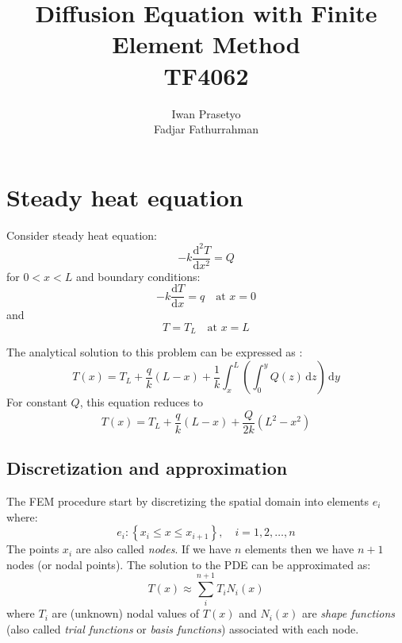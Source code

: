 \documentclass[a4paper,12pt]{article} %
\begin{document}
\title{Diffusion Equation with Finite Element Method \\
TF4062}
\author{Iwan Prasetyo \\
Fadjar Fathurrahman}
\date{}
\maketitle


\section{Steady heat equation}

Consider steady heat equation:
\begin{equation}
-k \frac{\mathrm{d}^2 T}{\mathrm{d}x^2} = Q
\end{equation}
for $0 < x < L$ and boundary conditions:
\begin{equation}
-k\frac{\mathrm{d}T}{\mathrm{d}x} = q \quad \text{at } x = 0
\end{equation}
and
\begin{equation}
T = T_{L} \quad \text{at } x = L
\end{equation}

The analytical solution to this problem can be expressed as \cite{Heinrich2017}:
\begin{equation}
T(x) = T_{L} + \frac{q}{k}(L - x) + \frac{1}{k} \int_{x}^{L}
\left( \int_{0}^{y} Q(z)\,\mathrm{d}z \right)\,\mathrm{d}y
\end{equation}
%
For constant $Q$, this equation reduces to
\begin{equation}
T(x) = T_{L} + \frac{q}{k}(L - x) + \frac{Q}{2k}(L^2 - x^2)
\end{equation}

\subsection{Discretization and approximation}

The FEM procedure start by discretizing the spatial domain into elements $e_{i}$
where:
\begin{equation}
e_{i}: \left\{ x_{i} \leq x \leq x_{i+1} \right\},\quad i=1,2,\ldots,n
\end{equation}
The points $x_{i}$ are also called \textit{nodes}. If we have $n$ elements then we
have $n+1$ nodes (or nodal points).
The solution to the PDE can be approximated as:
\begin{equation}
T(x) \approx \sum_{i}^{n+1} T_{i} N_{i}(x)
\end{equation}
where $T_i$ are (unknown) nodal values of $T(x)$ and $N_{i}(x)$ are \textit{shape functions}
(also called \textit{trial functions} or \textit{basis functions}) associated with each node.
\end{document}
